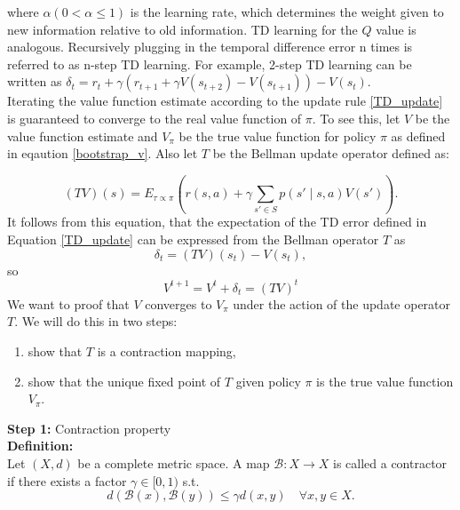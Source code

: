 where $\alpha (0 < \alpha \leq 1)$ is the learning rate, which determines the weight given to new information relative to old information. TD learning for the $Q$ 
value is analogous. Recursively plugging in the temporal difference error n times is referred to as n-step TD learning. For example, 2-step TD learning can be written as 
$\delta_t = r_t + \gamma (r_{t+1} + \gamma V(s_{t+2}) - V(s_{t+1})  ) - V(s_t)$.\\

Iterating the value function estimate according to the update rule \ref{TD_update} is guaranteed to converge to the real value function of $\pi$. To see this, 
let $V$ be the value function estimate and $V_{\pi}$ be the true value function for policy $\pi$ as defined in eqaution \ref{bootstrap_v}. Also let $T$ be the 
Bellman update operator defined as:

\begin{equation}
    (T V)(s) = E_{\tau \propto \pi} \left(r(s,a) + \gamma \sum_{s' \in S} p(s' \mid s,a) V(s')\right).
\end{equation}
It follows from this equation, that the expectation of the TD error defined in Equation \ref{TD_update} can be expressed from the Bellman operator $T$ as 
\begin{equation}
    \label{TD_update_BM}
    \delta_t = (T V)(s_t) - V(s_t),
\end{equation} 
so 
\begin{equation*}
    V^{t+1} = V^t + \delta_t = (T V)^t
\end{equation*}
We want to proof that $V$ converges to $V_{\pi}$ under the action of the update operator $T$. We will do this in two steps:
\begin{enumerate}
    \item show that $T$ is a contraction mapping,
    \item show that the unique fixed point of $T$ given policy $\pi$ is the true value function $V_{\pi}$.
\end{enumerate}

\textbf{Step 1:} Contraction property\\
\textbf{Definition:}\\
Let $(X, d)$ be a complete metric space. A map $\mathcal{B}:X \rightarrow X$ is called a contractor if there exists a factor $\gamma \in [0, 1)$ s.t.
\begin{equation}
    d(\mathcal{B}(x), \mathcal{B}(y)) \leq \gamma d(x,y) \quad \forall x,y \in X.
\end{equation}
\\ 

